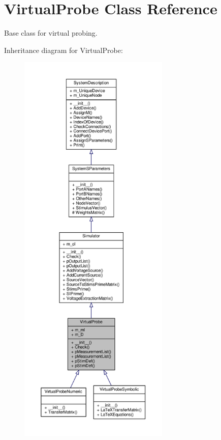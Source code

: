 \hypertarget{classSignalIntegrity_1_1SystemDescriptions_1_1VirtualProbe_1_1VirtualProbe}{}\section{Virtual\+Probe Class Reference}
\label{classSignalIntegrity_1_1SystemDescriptions_1_1VirtualProbe_1_1VirtualProbe}


Base class for virtual probing.  




Inheritance diagram for Virtual\+Probe\+:\nopagebreak
\begin{figure}[H]
\begin{center}
\leavevmode
\includegraphics[height=550pt]{classSignalIntegrity_1_1SystemDescriptions_1_1VirtualProbe_1_1VirtualProbe__inherit__graph}
\end{center}
\end{figure}


